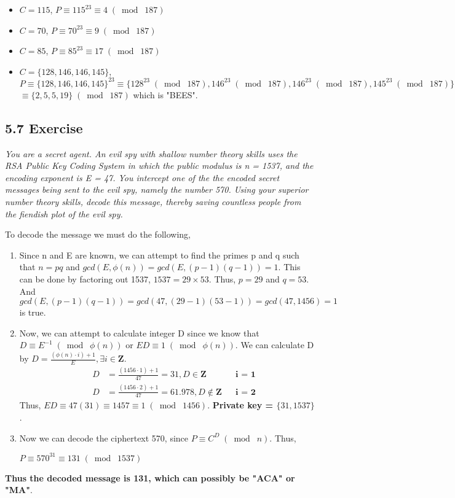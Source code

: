 \documentclass{article}
\begin{document}
\begin{enumerate}
    \begin{itemize}
        \item $C = 115$, $P \equiv 115^{23} \equiv 4 \;(\bmod\; 187)$
        \item $C = 70$, $P \equiv 70^{23} \equiv 9 \;(\bmod\; 187)$
        \item $C = 85$, $P \equiv 85^{23} \equiv 17 \;(\bmod\; 187)$
        \item $C = \{128, 146, 146, 145\}$, $P \equiv \{128, 146, 146, 145\}^{23} \equiv \{128^{23} \;(\bmod\; 187), 146^{23} \;(\bmod\; 187), 146^{23} \;(\bmod\; 187), 145^{23} \;(\bmod\; 187)\}$\\
        $\equiv \{2, 5, 5, 19\} \;(\bmod\; 187)$ which is "BEES".
    \end{itemize}
\end{enumerate}

\subsection*{5.7 Exercise} 
\quad \textit{You are a secret agent. An evil spy with shallow number theory skills uses the RSA Public Key Coding System in which the public modulus is n = 1537, and the encoding exponent is E = 47. You intercept one of the the encoded secret messages being sent to the evil spy, namely the number 570. Using your superior number theory skills, decode this message, thereby saving countless people from the fiendish plot of the evil spy.}

To decode the message we must do the following,
\begin{enumerate}
    \item Since n and E are known, we can attempt to find the primes p and q such that $n = pq$ and $gcd(E, \phi(n)) = gcd(E, (p-1)(q-1)) = 1$. This can be done by factoring out 1537, $1537 = 29 \times 53$. Thus, $p = 29$ and $q = 53$. And $gcd(E, (p-1)(q-1)) = gcd(47, (29-1)(53-1)) = gcd(47, 1456) = 1$ is true.
    \item Now, we can attempt to calculate integer D since we know that $D \equiv E^{-1} \;(\bmod\; \phi(n))$ or $ED \equiv 1 \;(\bmod\; \phi(n))$. We can calculate D by $D = \frac{(\phi(n) \cdot i) + 1}{E}, \exists i \in \mathbf{Z}$.
    \begin{align*}
        &&D &= \frac{(1456 \cdot 1) + 1}{47} = 31, D \in \mathbf{Z} && \textbf{i = 1}\\
        &&D &= \frac{(1456 \cdot 2) + 1}{47} = 61.978, D \not\in \mathbf{Z} && \textbf{i = 2}
    \end{align*}
    Thus, $ED \equiv 47(31) \equiv 1457 \equiv 1 \;(\bmod\; 1456)$. \textbf{Private key = $\{31, 1537\}$}.
    \item Now we can decode the ciphertext 570, since $P \equiv C^{D} \;(\bmod\; n)$. Thus,
        \begin{center}
            $P \equiv 570^{31} \equiv 131 \;(\bmod\; 1537)$
        \end{center}
\end{enumerate}
\textbf{Thus the decoded message is 131, which can possibly be "ACA" or "MA"}.
\end{document}
